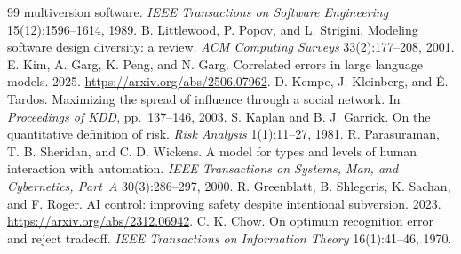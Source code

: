 \documentclass[11pt]{article}
\theoremstyle{definition}
\theoremstyle{remark}
\begin{document}
\begin{thebibliography}{99}
multiversion software. \emph{IEEE Transactions on Software Engineering} 15(12):1596--1614, 1989.
 B. Littlewood, P. Popov, and L. Strigini. Modeling software design diversity: a
review. \emph{ACM Computing Surveys} 33(2):177--208, 2001.
 E. Kim, A. Garg, K. Peng, and N. Garg. Correlated errors in large language models.
2025. \url{https://arxiv.org/abs/2506.07962}.
 D. Kempe, J. Kleinberg, and \'E. Tardos. Maximizing the spread of influence through a
social network. In \emph{Proceedings of KDD}, pp.~137--146, 2003.
 S. Kaplan and B. J. Garrick. On the quantitative definition of risk. \emph{Risk
Analysis} 1(1):11--27, 1981.
 R. Parasuraman, T. B. Sheridan, and C. D. Wickens. A model for types and levels
of human interaction with automation. \emph{IEEE Transactions on Systems, Man, and Cybernetics,
Part~A} 30(3):286--297, 2000.
 R. Greenblatt, B. Shlegeris, K. Sachan, and F. Roger. AI control: improving
safety despite intentional subversion. 2023. \url{https://arxiv.org/abs/2312.06942}.
 C. K. Chow. On optimum recognition error and reject tradeoff. \emph{IEEE Transactions
on Information Theory} 16(1):41--46, 1970.
\end{thebibliography}
\end{document}

